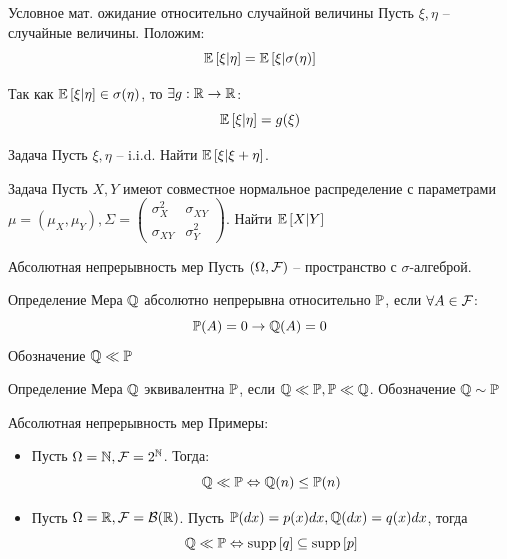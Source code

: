 \documentclass{beamer}
\begin{document}
\begin{frame}{Условное мат. ожидание относительно случайной величины}
    Пусть $\xi, \eta$ -- случайные величины. Положим:
    $$
        \mathbb{E}\left[\xi | \eta\right] = \mathbb{E}\left[ \xi | \sigma(\eta) \right]
    $$

    Так как $\mathbb{E}\left[\xi | \eta\right] \in \sigma(\eta)$, то $\exists g:\mathbb{R}\to\mathbb{R}$: 
    $$
    \mathbb{E}\left[\xi | \eta\right] = g(\xi)
    $$

    \begin{block}{Задача}
        Пусть $\xi, \eta$ -- i.i.d. Найти $\mathbb{E} \left[ \xi | \xi + \eta\right]$.
    \end{block}

    \begin{block}{Задача}
        Пусть $X, Y$ имеют совместное нормальное распределение с параметрами $\mu = (\mu_X, \mu_Y), \Sigma = \begin{pmatrix}
            \sigma_X^2 & \sigma_{XY} \\
            \sigma_{XY} & \sigma_Y^2
        \end{pmatrix}$. Найти $\mathbb{E} \left[ X | Y\right]$
    \end{block}
\end{frame}

\begin{frame}{Абсолютная непрерывность мер}
    Пусть $(\Omega, \mathcal{F})$ -- пространство с $\sigma$-алгеброй.

    \begin{block}{Определение}
        Мера $\mathbb{Q}$ абсолютно непрерывна относительно $\mathbb{P}$, если $\forall A \in \mathcal{F}$:
        $$
            \mathbb{P}(A) = 0 \to \mathbb{Q}(A) = 0
        $$Обозначение $\mathbb{Q} \ll \mathbb{P}$
    \end{block}

    \begin{block}{Определение}
        Мера $\mathbb{Q}$ эквивалентна $\mathbb{P}$, если $\mathbb{Q} \ll \mathbb{P}, \mathbb{P} \ll \mathbb{Q}$. Обозначение $\mathbb{Q} \sim \mathbb{P}$
    \end{block}
\end{frame}

\begin{frame}{Абсолютная непрерывность мер}
    Примеры:
    \begin{itemize}
        \item     Пусть $\Omega = \mathbb{N}, \mathcal{F}=2^{\mathbb{N}}$. Тогда:
    $$
        \mathbb{Q} \ll \mathbb{P} \Leftrightarrow \mathbb{Q}(n) \leq \mathbb{P}(n)
    $$

\item     Пусть $\Omega=\mathbb{R}, \mathcal{F} = \mathcal{B}(\mathbb{R})$. Пусть $\mathbb{P}(dx) = p(x)dx, \mathbb{Q}(dx) = q(x) dx$, тогда 
    $$
        \mathbb{Q} \ll \mathbb{P} \Leftrightarrow \mathrm{supp}\left[q\right] \subseteq\mathrm{supp}\left[p\right] 
    $$
    \end{itemize}
\end{frame}
\end{document}
